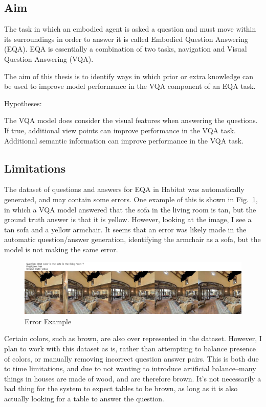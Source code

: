 \documentclass{article}
\begin{document}
\subsection{Aim}
The task in which an embodied agent is asked a question and must move within its surroundings in order to answer it is called Embodied Question Answering (EQA). EQA is essentially a combination of two tasks, navigation and Visual Question Answering (VQA).

The aim of this thesis is to identify ways in which prior or extra knowledge can be used to improve model performance in the VQA component of an EQA task.

Hypotheses: 
\begin{outline}
	\1 The VQA model does consider the visual features when answering the questions.
		\2 If true, additional view points can improve performance in the VQA task. 
	\1 Additional semantic information can improve performance in the VQA task.
\end{outline}


\subsection{Limitations}
The dataset of questions and answers for EQA in Habitat was automatically generated, and may contain some errors. One example of this is shown in Fig.~\ref{fig:err_ex}, in which a VQA model answered that the sofa in the living room is tan, but the ground truth answer is that it is yellow. However, looking at the image, I see a tan sofa and a yellow armchair. It seems that an error was likely made in the automatic question/answer generation, identifying the armchair as a sofa, but the model is not making the same error. 

\begin{figure}[h]
	\centering
	\includegraphics[width=\textwidth]{../error_images/ckpt_0_121_image.jpg}
	\caption{Error Example}
	\label{fig:err_ex}
\end{figure}
Certain colors, such as brown, are also over represented in the dataset. However, I plan to work with this dataset as is, rather than attempting to balance presence of colors, or manually removing incorrect question answer pairs. This is both due to time limitations, and due to not wanting to introduce artificial balance--many things in houses are made of wood, and are therefore brown. It's not necessarily a bad thing for the system to expect tables to be brown, as long as it is also actually looking for a table to answer the question. 
\end{document}
